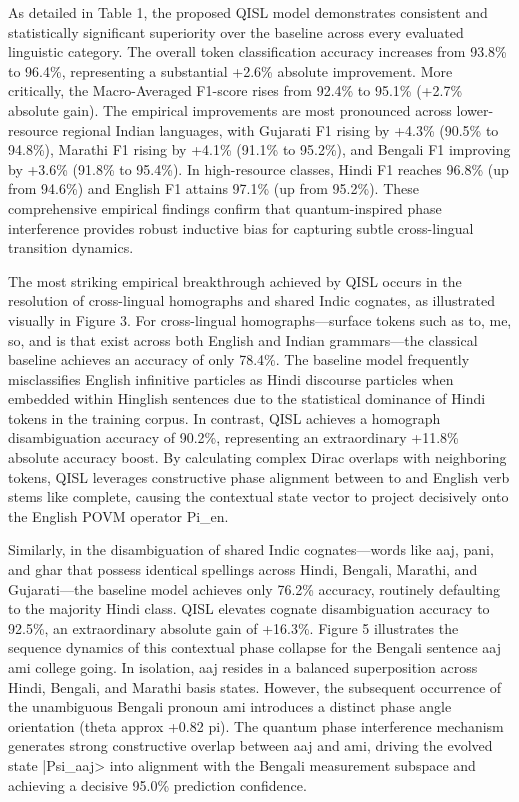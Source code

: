 \documentclass[10pt,twocolumn,letterpaper]{article}
\theoremstyle{definition}
\begin{document}
As detailed in Table 1, the proposed QISL model demonstrates consistent and statistically significant superiority over the baseline across every evaluated linguistic category. The overall token classification accuracy increases from 93.8\% to 96.4\%, representing a substantial +2.6\% absolute improvement. More critically, the Macro-Averaged F1-score rises from 92.4\% to 95.1\% (+2.7\% absolute gain). The empirical improvements are most pronounced across lower-resource regional Indian languages, with Gujarati F1 rising by +4.3\% (90.5\% to 94.8\%), Marathi F1 rising by +4.1\% (91.1\% to 95.2\%), and Bengali F1 improving by +3.6\% (91.8\% to 95.4\%). In high-resource classes, Hindi F1 reaches 96.8\% (up from 94.6\%) and English F1 attains 97.1\% (up from 95.2\%). These comprehensive empirical findings confirm that quantum-inspired phase interference provides robust inductive bias for capturing subtle cross-lingual transition dynamics.

The most striking empirical breakthrough achieved by QISL occurs in the resolution of cross-lingual homographs and shared Indic cognates, as illustrated visually in Figure 3. For cross-lingual homographs—surface tokens such as to, me, so, and is that exist across both English and Indian grammars—the classical baseline achieves an accuracy of only 78.4\%. The baseline model frequently misclassifies English infinitive particles as Hindi discourse particles when embedded within Hinglish sentences due to the statistical dominance of Hindi tokens in the training corpus. In contrast, QISL achieves a homograph disambiguation accuracy of 90.2\%, representing an extraordinary +11.8\% absolute accuracy boost. By calculating complex Dirac overlaps with neighboring tokens, QISL leverages constructive phase alignment between to and English verb stems like complete, causing the contextual state vector to project decisively onto the English POVM operator Pi\_en.

Similarly, in the disambiguation of shared Indic cognates—words like aaj, pani, and ghar that possess identical spellings across Hindi, Bengali, Marathi, and Gujarati—the baseline model achieves only 76.2\% accuracy, routinely defaulting to the majority Hindi class. QISL elevates cognate disambiguation accuracy to 92.5\%, an extraordinary absolute gain of +16.3\%. Figure 5 illustrates the sequence dynamics of this contextual phase collapse for the Bengali sentence aaj ami college going. In isolation, aaj resides in a balanced superposition across Hindi, Bengali, and Marathi basis states. However, the subsequent occurrence of the unambiguous Bengali pronoun ami introduces a distinct phase angle orientation (theta approx +0.82 pi). The quantum phase interference mechanism generates strong constructive overlap between aaj and ami, driving the evolved state |Psi\_aaj> into alignment with the Bengali measurement subspace and achieving a decisive 95.0\% prediction confidence.
\end{document}
